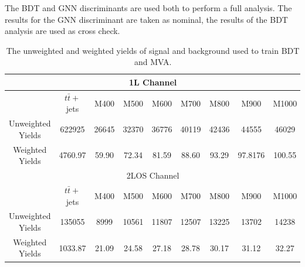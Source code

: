 The BDT and GNN discriminants are used both to perform a full analysis. The results for the GNN discriminant are taken as nominal, the results of the BDT analysis are used as cross check.

\begin{table}[h!]
\centering
\begin{tabular}{c|c|c|c|c|c|c|c|c}
\hline \hline
\multicolumn{9}{c}{1L Channel} \\
\hline
& $t\bar{t}+$ jets & M400 & M500 & M600 & M700 & M800 & M900 & M1000 \\
Unweighted Yields & 622925 & 26645 & 32370 & 36776 & 40119 & 42436 & 44555 & 46029 \\
Weighted Yields & 4760.97 & 59.90 & 72.34 & 81.59 & 88.60 & 93.29 & 97.8176 & 100.55 \\
\hline
\multicolumn{9}{c}{2LOS Channel} \\
\hline
& $t\bar{t}+$ jets & M400 & M500 & M600 & M700 & M800 & M900 & M1000 \\
Unweighted Yields & 135055 & 8999 & 10561 & 11807 & 12507 & 13225 & 13702 & 14238 \\
Weighted Yields & 1033.87 & 21.09 & 24.58 & 27.18 & 28.78 & 30.17 & 31.12 & 32.27 \\
\hline \hline
\end{tabular}
\caption{\label{tab:MVAYields}The unweighted and weighted yields of signal and \ttbar background used to train BDT and MVA.}
\end{table}

